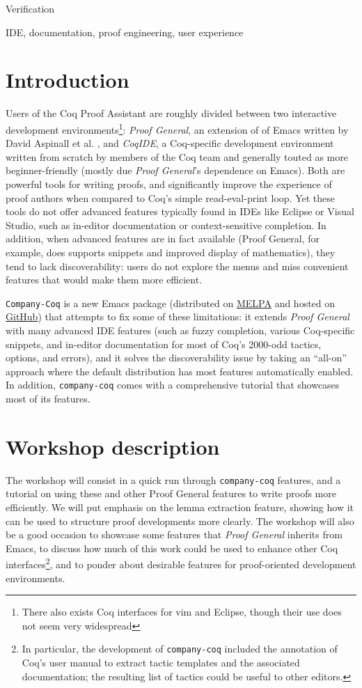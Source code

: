 \documentclass[preprint]{sigplanconf}
\newcommand{\proofg}{\emph{Proof General}\xspace}
\begin{document}
\terms Verification

\keywords IDE, documentation, proof engineering, user experience

\section*{Introduction}

Users of the Coq Proof Assistant \cite{Coq} are roughly divided between two interactive development environments\footnote{There also exists Coq interfaces for vim and Eclipse, though their use does not seem very widespread}: \proofg, an extension of of Emacs written by David Aspinall et al. \cite{ProofGeneral}, and \emph{CoqIDE}, a Coq-specific development environment written from scratch by members of the Coq team and generally touted as more beginner-friendly (mostly due \proofg's dependence on Emacs). Both are powerful tools for writing proofs, and significantly improve the experience of proof authors when compared to Coq's simple read-eval-print loop. Yet these tools do not offer advanced features typically found in IDEs like Eclipse or Visual Studio, such as in-editor documentation or context-sensitive completion. In addition, when advanced features are in fact available (Proof General, for example, does supports snippets and improved display of mathematics), they tend to lack discoverability: users do not explore the menus and miss convenient features that would make them more efficient.

\texttt{Company-Coq} is a new Emacs package (distributed on \href{http://melpa.org/#/company-coq}{MELPA} and hosted on \href{https://github.com/cpitclaudel/company-coq/}{GitHub}) that attempts to fix some of these limitations: it extends \proofg with many advanced IDE features (such as fuzzy completion, various Coq-specific snippets, and in-editor documentation for most of Coq's 2000-odd tactics, options, and errors), and it solves the discoverability issue by taking an ``all-on'' approach where the default distribution has most features automatically enabled. In addition, \texttt{company-coq} comes with a comprehensive tutorial that showcases most of its features.

\section*{Workshop description}

The workshop will consist in a quick run through \texttt{company-coq} features, and a tutorial on using these and other Proof General features to write proofs more efficiently. We will put emphasis on the lemma extraction feature, showing how it can be used to structure proof developments more clearly. The workshop will also be a good occasion to showcase some features that \proofg inherits from Emacs, to discuss how much of this work could be used to enhance other Coq interfaces\footnote{In particular, the development of \texttt{company-coq} included the annotation of Coq's user manual to extract tactic templates and the associated documentation; the resulting list of tactics could be useful to other editors.}, and to ponder about desirable features for proof-oriented development environments.
\end{document}
